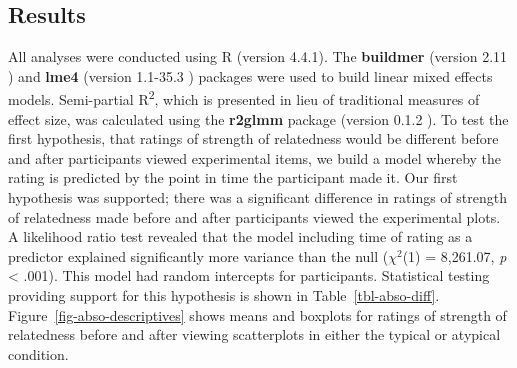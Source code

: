 \documentclass[manuscript,screen,review,anonymous]{acmart}
\begin{document}
\subsection{Results}\label{sec-results-main}

All analyses were conducted using R (version 4.4.1). The
\textbf{buildmer} (version 2.11 \citep{buildmer}) and \textbf{lme4}
(version 1.1-35.3 \citep{lme4}) packages were used to build linear mixed
effects models. Semi-partial R\textsuperscript{2}, which is presented in
lieu of traditional measures of effect size, was calculated using the
\textbf{r2glmm} package (version 0.1.2 \citep{r2glmm}). To test the
first hypothesis, that ratings of strength of relatedness would be
different before and after participants viewed experimental items, we
build a model whereby the rating is predicted by the point in time the
participant made it. Our first hypothesis was supported; there was a
significant difference in ratings of strength of relatedness made before
and after participants viewed the experimental plots. A likelihood ratio
test revealed that the model including time of rating as a predictor
explained significantly more variance than the null (\(\chi^2\)(1) =
8,261.07, \emph{p} \textless{} .001). This model had random intercepts
for participants. Statistical testing providing support for this
hypothesis is shown in Table~\ref{tbl-abso-diff}.
Figure~\ref{fig-abso-descriptives} shows means and boxplots for ratings
of strength of relatedness before and after viewing scatterplots in
either the typical or atypical condition.

\begin{table}

\caption{\label{tbl-abso-diff}Statistics for the significant main effect
of rating time. Semi-partial R\textsuperscript{2} is also incuded.}


\end{table}%
\end{document}

